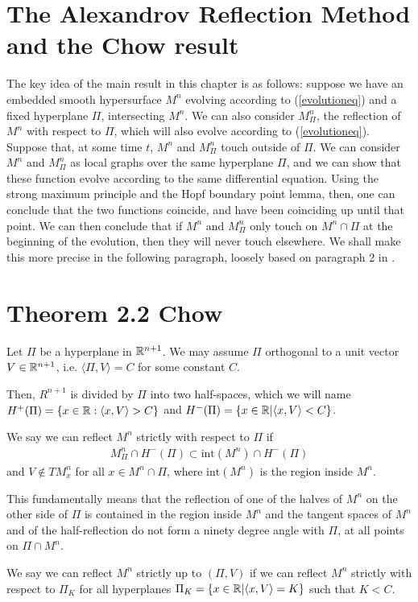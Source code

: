 \section{The Alexandrov Reflection Method and the Chow result}


The key idea of the main result in this chapter is as follows: suppose we have an embedded smooth hypersurface $M^n$ evolving according to (\ref{evolutioneq}) and a fixed hyperplane $\Pi$, intersecting $M^n$. We can also consider $M^n_\Pi$, the reflection of $M^n$ with respect to $\Pi$, which will also evolve according to (\ref{evolutioneq}). Suppose that, at some time $t$, $M^n$ and  $M^n_\Pi$ touch outside of $\Pi$. We can consider $M^n$ and  $M^n_\Pi$ as local graphs over the same hyperplane $\Pi$, and we can show that these function evolve according to the same differential equation. Using the strong maximum principle and the Hopf boundary point lemma, then, one can conclude that the two functions coincide, and have been coinciding up until that point. We can then conclude that if  $M^n$ and  $M^n_\Pi$ only touch on $M^n\cap\Pi$ at the beginning of the evolution, then they will never touch elsewhere. We shall make this more precise in the following paragraph, loosely based on paragraph 2 in \cite{Chow}. 

\section{Theorem 2.2 Chow}



Let $\Pi$ be a hyperplane in $\mathbb{R}^{n+1}$. We may assume $\Pi$ orthogonal to a unit vector $V\in\mathbb{R}^{n+1}$, i.e. $\langle\Pi, V\rangle= C$ for some constant $C$. 

Then, $R^{n+1}$ is divided by $\Pi$ into two half-spaces, which we will name  $H^+(\Pi)=\{x \in \mathbb{R} : \langle x, V\rangle > C\}$ and  $H^-(\Pi)=\{x \in \mathbb{R} | \langle x, V\rangle < C\}$. 

\begin{defin}
	We say we can reflect $M^n$ strictly with respect to $\Pi$ if 
	\begin{align*}
		M^n_\Pi\cap H^-(\Pi)\subset \mathrm{int}(M^n)\cap H^-(\Pi)
	\end{align*} 
	and $V\notin TM^n_x$ for all $x\in M^n \cap\Pi$, where $\mathrm{int}(M^n)$ is the region inside $M^n$. 
\end{defin}
This fundamentally means that the reflection of one of the halves of $M^n$ on the other side of $\Pi$ is contained in the region inside $M^n$ and the tangent spaces of $M^n$ and of the half-reflection do not form a ninety degree angle with $\Pi$, at all points on $\Pi\cap M^n$. 
\begin{defin}
	We say we can reflect $M^n$ strictly up to $(\Pi,V)$ if we can reflect $M^n$ strictly with respect to $\Pi_K$ for all hyperplanes $\Pi_K=\{x \in \mathbb{R} | \langle x, V\rangle = K\}$ such that $K<C$.  
\end{defin}

